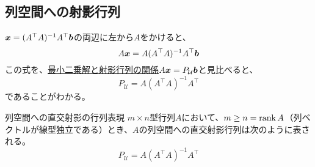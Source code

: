 \documentclass[../../../topic_linear-algebra]{subfiles}
\begin{document}
\subsection{列空間への射影行列}

$\vb*{x} = (A^\top A)^{-1}A^\top \vb*{b}$の両辺に左から$A$をかけると、
\begin{equation*}
  A\vb*{x} = A(A^\top A)^{-1}A^\top \vb*{b}
\end{equation*}
この式を、\hyperref[thm:least-squares-projection]{最小二乗解と射影行列の関係}$A\vb*{x} = P_{\mathcal{U}}\vb*{b}$と見比べると、
\begin{equation*}
  P_{\mathcal{U}} = A(A^\top A)^{-1}A^\top
\end{equation*}
であることがわかる。

\begin{theorem}{列空間への直交射影の行列表現}
  $m \times n$型行列$A$において、$m \geq n = \rank A$（列ベクトルが線型独立である）とき、$A$の列空間への直交射影行列は次のように表される。
  \begin{equation*}
    P_{\mathcal{U}} = A(A^\top A)^{-1}A^\top
  \end{equation*}
\end{theorem}
\end{document}
